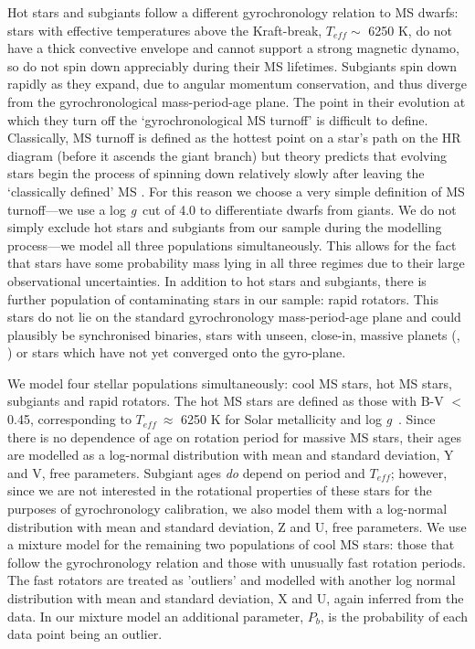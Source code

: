 \documentclass[10pt,preprint]{aastex}
\newcommand{\logg}{log \emph{g}~}
\newcommand{\teff}{$T_{eff}~$}
\begin{document}
Hot stars and subgiants follow a different gyrochronology relation to MS dwarfs: stars with effective temperatures above the Kraft-break, $T_{eff} \sim$ 6250 K, \citep{Kraft1967} do not have a thick convective envelope and cannot support a strong magnetic dynamo, so do not spin down appreciably during their MS lifetimes.
Subgiants spin down rapidly as they expand, due to angular momentum conservation, and thus diverge from the gyrochronological mass-period-age plane.
The point in their evolution at which they turn off the `gyrochronological MS turnoff' is difficult to define.
Classically, MS turnoff is defined as the hottest point on a star's path on the HR diagram (before it ascends the giant branch) but theory predicts that evolving stars begin the process of spinning down relatively slowly after leaving the `classically defined' MS \citep{vanSaders2013}.
For this reason we choose a very simple definition of MS turnoff---we use a \logg cut of 4.0 to differentiate dwarfs from giants.
We do not simply exclude hot stars and subgiants from our sample during the modelling process---we model all three populations simultaneously.
This allows for the fact that stars have some probability mass lying in all three regimes due to their large observational uncertainties.
In addition to hot stars and subgiants, there is further population of contaminating stars in our sample: rapid rotators.
This stars do not lie on the standard gyrochronology mass-period-age plane and could plausibly be synchronised binaries, stars with unseen, close-in, massive planets (\citet{Poppenhaeger2014}, \citet{Beky2014}) or stars which have not yet converged onto the gyro-plane.

We model four stellar populations simultaneously: cool MS stars, hot MS stars, subgiants and rapid rotators.
The hot MS stars are defined as those with B-V $<$ 0.45, corresponding to \teff $\approx$ 6250 K for Solar metallicity and \logg.
Since there is no dependence of age on rotation period for massive MS stars, their ages are modelled as a log-normal distribution with mean and standard deviation, Y and V, free parameters.
Subgiant ages \emph{do} depend on period and $T_{eff}$; however, since we are not interested in the rotational properties of these stars for the purposes of gyrochronology calibration, we also model them with a log-normal distribution with mean and standard deviation, Z and U, free parameters.
We use a mixture model for the remaining two populations of cool MS stars: those that follow the gyrochronology relation and those with unusually fast rotation periods.
The fast rotators are treated as 'outliers' and modelled with another log normal distribution with mean and standard deviation, X and U, again inferred from the data.
In our mixture model an additional parameter, $P_b$, is the probability of each data point being an outlier.
\end{document}
